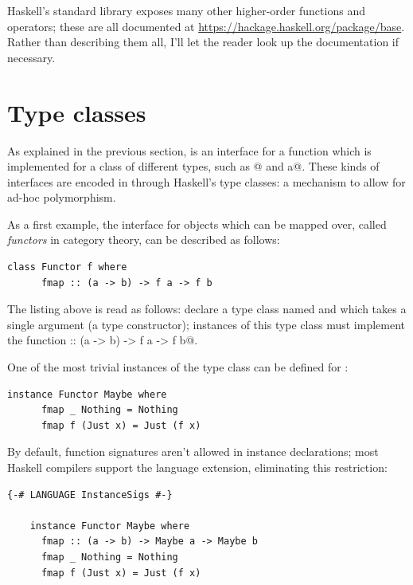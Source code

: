 \documentclass[UdineBachThesis,american,11pt]{PhdThesis}
\begin{document}
  Haskell's standard library exposes many other higher-order functions and
  operators; these are all documented at
  \url{https://hackage.haskell.org/package/base}. Rather than describing them
  all, I'll let the reader look up the documentation if necessary.

  \section{Type classes}

  As explained in the previous section, \lstinline@foldr@ is an interface for a
  function which is implemented for a class of different types, such as
  \lstinline@[a]@ and \lstinline@Maybe a@. These kinds of interfaces are encoded
  in through Haskell's type classes: a mechanism to allow for ad-hoc
  polymorphism.

  As a first example, the interface for objects which can be mapped over, called
  \emph{functors} in category theory, can be described as follows:

  \begin{lstlisting}[gobble=4,basicstyle=\ttfamily\small]
    class Functor f where
      fmap :: (a -> b) -> f a -> f b
  \end{lstlisting}

  The listing above is read as follows: declare a type class named
  \lstinline@Functor@ and which takes a single argument \lstinline@f@ (a type
  constructor); instances of this type class must implement the function
  \lstinline@fmap :: (a -> b) -> f a -> f b@.

  One of the most trivial instances of the \lstinline@Functor@ type class can be
  defined for \lstinline@Maybe@:

  \begin{lstlisting}[gobble=4,basicstyle=\ttfamily\small]
    instance Functor Maybe where
      fmap _ Nothing = Nothing
      fmap f (Just x) = Just (f x)
  \end{lstlisting}

  By default, function signatures aren't allowed in instance declarations; most
  Haskell compilers support the \lstinline@InstanceSigs@ language extension,
  eliminating this restriction:

  \begin{lstlisting}[gobble=4,basicstyle=\ttfamily\small]
    {-# LANGUAGE InstanceSigs #-}

    instance Functor Maybe where
      fmap :: (a -> b) -> Maybe a -> Maybe b
      fmap _ Nothing = Nothing
      fmap f (Just x) = Just (f x)
  \end{lstlisting}
\end{document}
